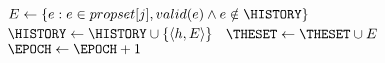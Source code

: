 \begin{figure}[t!]
\begin{algorithm}[H]
\begin{algorithmic}[1]
			        \State $E \leftarrow \{e : e \in propset[j], valid(e) \wedge e\notin \HISTORY\}$~\label{forall_e_SBCDeliver}
				    \State $\HISTORY \leftarrow \HISTORY \cup \{\langle h, E \rangle\}$~\label{add_history_SBCSetDeliver}
				    \State $\THESET \leftarrow \THESET \cup E$~\label{add_theset_SBCSetDeliver}
				    \State $\EPOCH \leftarrow \EPOCH+1$\label{set_epoch_SBCSetDeliver} %
			\EndUpon
		\end{algorithmic}
	\end{algorithm}\vspace{-2em}
\end{figure}

